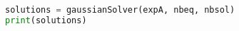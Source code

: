 \begin{lstlisting}[language=Python, style=jupycolors]
solutions = gaussianSolver(expA, nbeq, nbsol)
print(solutions)
\end{lstlisting}